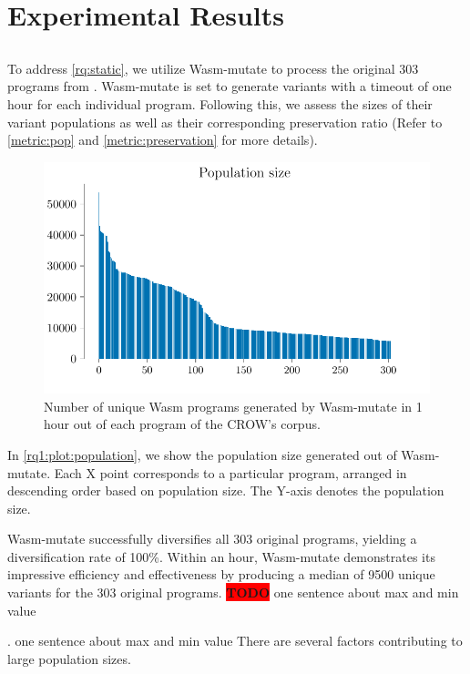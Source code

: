 \documentclass[sigplan,screen]{acmart}
\newcommand*\badge[1]{ \colorbox{red}{\color{white}#1}}
\newcommand{\tool}{Wasm-mutate\xspace}
\newcommand{\wasm}{Wasm\xspace}
\newcommand{\todo}[1]{%
\refstepcounter{todo}
\noindent\textbf{\badge{TODO}} {\color{red}#1}
\addcontentsline{td}{todo}
{\color{red}\thesection.\thetodo\xspace #1}}
\begin{document}
\section{Experimental Results}
\label{results}

\subsection{\rqstatic}
\label{rq:static:results}

\newcommand{\preserved}{72\%\xspace}

To address \ref{rq:static}, we utilize \tool to process the original 303 programs from \cite{arteaga2020crow}. 
\tool is set to generate variants with a timeout of one hour for each individual program. 
Following this, we assess the sizes of their variant populations as well as their corresponding preservation ratio (Refer to \autoref{metric:pop} and \autoref{metric:preservation} for more details).

\begin{figure}
    \centering
    \includegraphics[width=\linewidth]{plots/rq1/population.pdf}
    \caption{Number of unique \wasm programs generated by \tool in 1 hour out of each program of the CROW's corpus.}
  \label{rq1:plot:population}
\end{figure}


In \autoref{rq1:plot:population}, we show the population size generated out of \tool. 
Each X point corresponds to a particular program, arranged in descending order based on population size. 
The Y-axis denotes the population size. 

\tool successfully diversifies all 303 original programs, yielding a diversification rate of 100\%. 
Within an hour, \tool demonstrates its impressive efficiency and effectiveness by producing a median of 9500 unique variants for the 303 original programs. \todo{one sentence about max and min value}
There are several factors contributing to large population sizes. 
\end{document}
